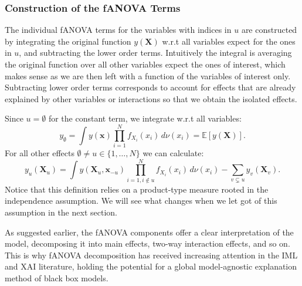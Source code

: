 \subsubsection*{Construction of the fANOVA Terms}
The individual fANOVA terms for the variables with indices in $u$ are constructed by integrating the original function $y(\boldsymbol{X})$ w.r.t all variables expect for the ones in $u$, and subtracting the lower order terms. Intuitively the integral is averaging the original function over all other variables expect the ones of interest, which makes sense as we are then left with a function of the variables of interest only. Subtracting lower order terms corresponds to account for effects that are already explained by other variables or interactions so that we obtain the isolated effects.\par
Since $u = \emptyset$ for the constant term, we integrate w.r.t all variables:
\begin{equation}
    y_{\emptyset} = \int y(\boldsymbol{x}) \prod_{i=1}^{N} f_{X_i}(x_i) \, d\nu (x_i) = \mathbb{E}[y(\boldsymbol{X})].
    \label{eq:intercept_classical}
\end{equation}
For all other effects $\emptyset \neq u \in \{1, \dots, N\}$ we can calculate:
\begin{equation}
    y_u(\boldsymbol{X}_u) = \int y(\boldsymbol{X}_u, \boldsymbol{x}_{-u}) \prod_{i=1, i \notin u}^{N} f_{X_i}(x_i) \, d\nu (x_i)- \sum_{v \subsetneq u} y_v(\boldsymbol{X}_v).
    \label{eq:fanova_components_classical}
\end{equation}
Notice that this definition relies on a product-type measure rooted in the independence assumption. We will see what changes when we let got of this assumption in the next section.\par
As suggested earlier, the fANOVA components offer a clear interpretation of the model, decomposing it into main effects, two-way interaction effects, and so on. This is why fANOVA decomposition has received increasing attention in the IML and XAI literature, holding the potential for a global model-agnostic explanation method of black box models.\par

